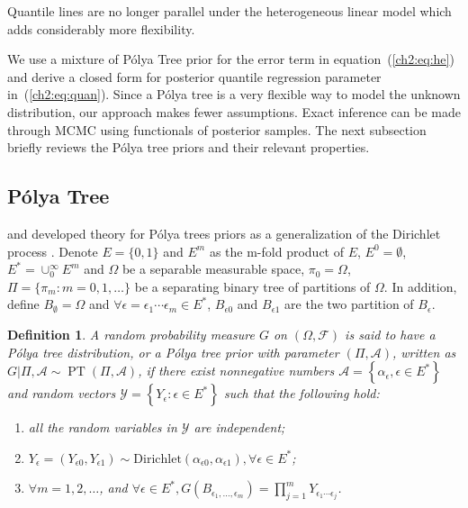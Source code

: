 \documentclass[12pt]{article}
\newtheorem{deff}[thm]{Definition}
\newcommand{\polya}{P\'{o}lya}
\DeclareMathOperator{\pt}{PT}
\begin{document}
Quantile lines are no longer parallel under the heterogeneous linear
model which adds considerably more flexibility.

We use a mixture of \polya{} Tree prior for the error term in equation~(\ref{ch2:eq:he})
 and derive a closed form for posterior quantile
regression parameter in~(\ref{ch2:eq:quan}).  Since a \polya{} tree is a
very flexible way to model the unknown distribution, our approach
makes fewer assumptions.  Exact inference can be made through MCMC using
functionals of posterior samples. The next subsection briefly reviews
the \polya{} tree priors and their relevant properties.

\subsection{\polya{} Tree}
\citet{lavine1992, lavine1994} and \citet{mauldin1992} developed
theory for \polya{} trees priors as a generalization of the Dirichlet
process \citep{ferguson1974}. Denote $E=\{0,1\}$ and $E^m$ as the
m-fold product of $E$, $E^0= \emptyset$, $E^{*} = \cup_0^{\infty} E^m$
and $\Omega$ be a separable measurable space, $\pi_0 = \Omega$, $\Pi=
\{ \pi_m: m=0,1, \ldots \} $ be a separating binary tree of partitions
of $\Omega$. In addition, define $B_{\emptyset} = \Omega$ and $\forall
\epsilon=\epsilon_1\cdots \epsilon_m \in E^{*}$, $B_{\epsilon 0}$ and
$B_{\epsilon 1}$ are the two partition of $B_{\epsilon}$.
\begin{deff}
  A random probability measure $G$ on $(\Omega, \mathcal{F})$ is said
  to have a \polya{} tree distribution, or a \polya{} tree prior with
  parameter $(\Pi, \mathcal{A})$, written as $G|\Pi, \mathcal{A} \sim
  \pt (\Pi, \mathcal{A})$, if there exist nonnegative numbers
  $\mathcal{A}= \left\{ \alpha_{\epsilon}, \epsilon \in E^{*}
  \right\}$ and random vectors $\mathcal{Y} = \left\{ Y_{\epsilon} :
    \epsilon \in E^{*} \right\}$ such that the following hold:
  \begin{enumerate}
  \item\label{ch2:item:1} all the random variables in $\mathcal{Y}$ are
    independent;
  \item $Y_{\epsilon}= (Y_{\epsilon 0}, Y_{\epsilon 1}) \sim
    \mathrm{Dirichlet}(\alpha_{\epsilon 0 }, \alpha_{\epsilon 1}),
    \forall \epsilon \in E^{*}$;
  \item $\forall m=1,2, \ldots$, and $\forall \epsilon \in E^{*},
    G(B_{\epsilon_{1}, \ldots, \epsilon_m}) = \prod_{j=1}^m
    Y_{\epsilon_1 \cdots \epsilon_j}$.
  \end{enumerate}
\end{deff}
\end{document}
